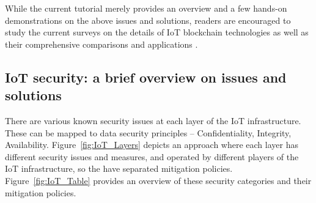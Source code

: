 \documentclass[a4paper]{article}
\begin{document}
While the current tutorial merely provides an overview and a few hands-on demonstrations on the above issues and solutions, readers are encouraged to study the current surveys on the details of IoT blockchain technologies \cite{BC_IoT_survey} as well as their comprehensive comparisons and applications \cite{BC_IoT_comprehensive}.

\subsection{IoT security: a brief overview on issues and solutions}

There are various known security issues at each layer of the IoT infrastructure. These can be mapped to data security principles -- Confidentiality, Integrity, Availability. Figure~\ref{fig:IoT_Layers} depicts an approach where each layer has different security issues and measures, and operated by different players of the IoT infrastructure, so the have separated mitigation policies. Figure~\ref{fig:IoT_Table} provides an overview of these security categories and their mitigation policies.
\end{document}
